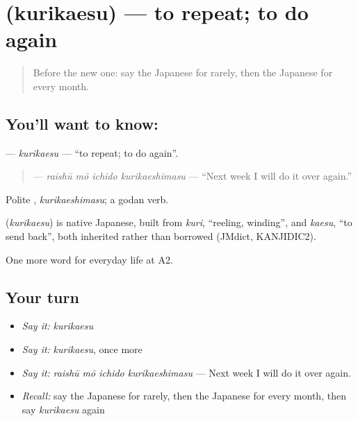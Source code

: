 \section[\texorpdfstring{\ja{くりかえす} (kurikaesu)}{くりかえす (kurikaesu)}]{ (kurikaesu) — to repeat; to do again}

\label{lesson:JA-C169-kurikaesu}



\begin{quote}
Before the new one: say the Japanese for rarely, then the Japanese for every month.
\end{quote}

\subsection*{You'll want to know: }
\textbf{} — \emph{kurikaesu} — \textquotedblleft{}to repeat; to do again\textquotedblright{}.

\begin{quote}
\textbf{  } — \emph{raishū mō ichido kurikaeshimasu} — \textquotedblleft{}Next week I will do it over again.\textquotedblright{}
\end{quote}

Polite \textbf{}, \emph{kurikaeshimasu}; a godan verb.

\begin{cousinweb}
\textbf{} (\emph{kurikaesu}) is native Japanese, built from \emph{kuri}, \textquotedblleft{}reeling, winding\textquotedblright{}, and \emph{kaesu}, \textquotedblleft{}to send back\textquotedblright{}, both inherited rather than borrowed (JMdict, KANJIDIC2).
\end{cousinweb}

\begin{grammarlens}[title={What you've built}]
One more word for everyday life at A2.
\end{grammarlens}

\subsection*{Your turn}
\begin{itemize}
\raggedright
  \item \emph{Say it:} \emph{kurikaesu}
  \item \emph{Say it:} \emph{kurikaesu}, once more
  \item \emph{Say it:} \emph{raishū mō ichido kurikaeshimasu} — Next week I will do it over again.
  \item \emph{Recall:} say the Japanese for rarely, then the Japanese for every month, then say \emph{kurikaesu} again
\end{itemize}

